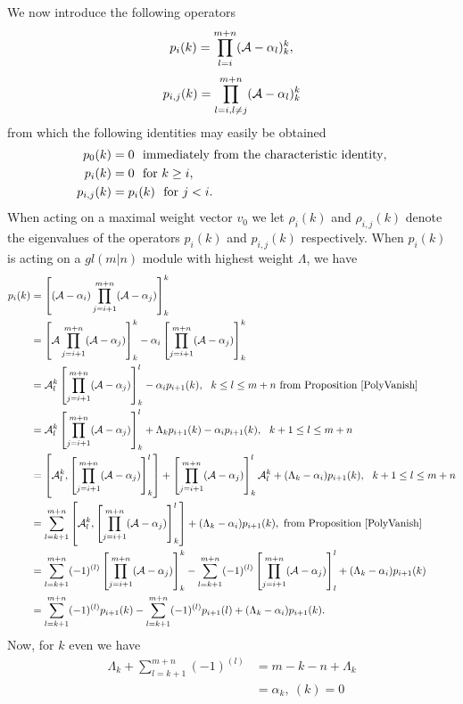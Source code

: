 \documentclass[12pt]{article}
\def\nn{\nonumber}
\begin{document}
We now introduce the following operators 
$$
p_i(k) = \prod^{m+n}_{l=i} ({\cal A} - \alpha_l)^k_k,
$$
$$
p_{i,j}(k) = \prod^{m+n}_{l=i,l \neq j} ({\cal A} - \alpha_l)^k_k
$$
from which the following identities may easily be obtained
\begin{align*}
p_0(k) &= 0 \hbox{~~immediately from the characteristic identity}, \\
p_i(k) &= 0 \hbox{~~for~} k \geq i, \\
p_{i,j}(k) &= p_i(k) \hbox{~~for~} j < i.
\end{align*}
When acting on a maximal weight vector $v_0$ we let $\rho_i(k)$ and $\rho_{i,j}(k)$ denote
the eigenvalues of the operators $p_i(k)$ and $p_{i,j}(k)$ respectively.
\newpage
When $p_i(k)$ is acting on a $gl(m|n)$ module with highest weight $\Lambda$, we have
\begin{align}
p_i(k) &= \left[ ({\cal A} - \alpha_i) \prod_{j=i+1}^{m+n} ({\cal A} - \alpha_j) \right]^k_k \nn\\
&= \left[ {\cal A} \prod_{j=i+1}^{m+n} ({\cal A} - \alpha_j) \right]^k_k - \alpha_i \left[ \prod_{j=i+1}^{m+n} ({\cal A} - \alpha_j) \right]^k_k \nn\\
&= {\cal A}^k_l \left[ \prod_{j=i+1}^{m+n} ({\cal A} - \alpha_j) \right]^l_k - \alpha_i p_{i+1}(k),~~k \leq l \leq m+n \hbox{~from Proposition \ref{PolyVanish}}\nn\\
&= {\cal A}^k_l \left[ \prod_{j=i+1}^{m+n} ({\cal A} - \alpha_j) \right]^l_k + \Lambda_k p_{i+1}(k) - \alpha_i p_{i+1}(k),~~k+1 \leq l \leq m+n \nn\\
&= \left[{\cal A}^k_l , \left[\prod_{j=i+1}^{m+n} ({\cal A} - \alpha_j) \right]^l_k \right] 
+ \left[\prod_{j=i+1}^{m+n} ({\cal A} - \alpha_j) \right]^l_k {\cal A}^k_l 
+ (\Lambda_k - \alpha_i) p_{i+1}(k),~~k+1 \leq l \leq m+n \nn \\
&= \sum_{l=k+1}^{m+n} \left[{\cal A}^k_l , \left[\prod_{j=i+1}^{m+n} ({\cal A} - \alpha_j) \right]^l_k \right] 
+ (\Lambda_k - \alpha_i) p_{i+1}(k),  \hbox{~from Proposition \ref{PolyVanish}} \nn\\
&= \sum_{l=k+1}^{m+n} (-1)^{(l)} \left[\prod_{j=i+1}^{m+n} ({\cal A} - \alpha_j) \right]^k_k - \sum_{l=k+1}^{m+n} (-1)^{(l)} \left[\prod_{j=i+1}^{m+n} ({\cal A} - \alpha_j) \right]^l_l + (\Lambda_k - \alpha_i) p_{i+1}(k) \nn \\
&= \sum_{l=k+1}^{m+n} (-1)^{(l)} p_{i+1}(k) - \sum_{l=k+1}^{m+n} (-1)^{(l)}  p_{i+1}(l) + (\Lambda_k - \alpha_i) p_{i+1}(k) \nn .
\end{align}
Now, for $k$ even we have
\begin{align*}
\Lambda_k + \sum_{l=k+1}^{m+n} (-1)^{(l)} &= m - k - n + \Lambda_k\\
 &= \alpha_k, ~(k) = 0
\end{align*}
\end{document}
